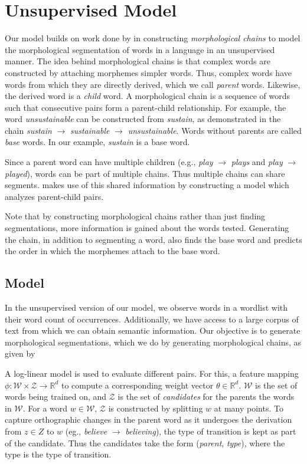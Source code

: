 \documentclass[11pt,twocolumn]{article}
\begin{document}
\section{Unsupervised Model}
Our model builds on work done by \citet{Narasimhan15} in constructing \emph{morphological chains} to model the morphological segmentation of words in a language in an unsupervised manner. The idea behind morphological chains is that complex words are constructed by attaching morphemes simpler words. Thus, complex words have words from which they are directly derived, which we call \emph{parent} words. Likewise, the derived word is a \emph{child} word. A morphological chain is a sequence of words such that consecutive pairs form a parent-child relationship. For example, the word \emph{unsustainable} can be constructed from \emph{sustain}, as demonstrated in the chain \emph{sustain} $\rightarrow$ \emph{sustainable} $\rightarrow$ \emph{unsustainable}. Words without parents are called \emph{base} words. In our example, \emph{sustain} is a base word.

Since a parent word can have multiple children (e.g., \emph{play} $\rightarrow$ \emph{plays} and \emph{play} $\rightarrow$ \emph{played}), words can be part of multiple chains. Thus multiple chains can share segments.
\citeauthor{Narasimhan15} makes use of this shared information by constructing a model which analyzes parent-child pairs.

Note that by constructing morphological chains rather than just finding segmentations, more information is gained about the words tested. Generating the chain, in addition to segmenting a word, also finds the base word and predicts the order in which the morphemes attach to the base word.

\subsection{Model}

In the unsupervised version of our model, we observe words in a wordlist with their word count of occurrences. Additionally, we have access to a large corpus of text from which we can obtain semantic information. Our objective is to generate morphological segmentations, which we do by generating morphological chains, as given by \citeauthor{Narasimhan15}

A log-linear model is used to evaluate different pairs. For this, a feature mapping $\phi: \mathcal W \times \mathcal Z \rightarrow \mathbb R^d$ to compute a corresponding weight vector $\theta\in\mathbb R^d$. $\mathcal W$ is the set of words being trained on, and $\mathcal Z$ is the set of \emph{candidates} for the parents the words in $\mathcal W$. For a word $w\in\mathcal W$, $\mathcal Z$ is constructed by splitting $w$ at many points. To capture orthographic changes in the parent word as it undergoes the derivation from $z\in Z$ to $w$ (eg., \emph{believe} $\rightarrow$ \emph{believing}), the type of transition is kept as part of the candidate. Thus the candidates take the form (\emph{parent}, \emph{type}), where the type is the type of transition.
\end{document}
